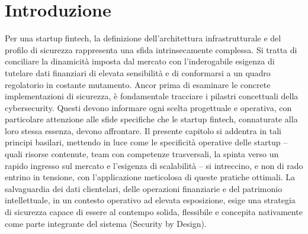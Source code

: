 \section{Introduzione}
Per una startup fintech, la definizione dell'architettura infrastrutturale e del profilo di sicurezza rappresenta una sfida intrinsecamente complessa. Si tratta di conciliare la dinamicità imposta dal mercato con l'inderogabile esigenza di tutelare dati finanziari di elevata sensibilità e di conformarsi a un quadro regolatorio in costante mutamento. Ancor prima di esaminare le concrete implementazioni di sicurezza, è fondamentale tracciare i pilastri concettuali della cybersecurity. Questi devono informare ogni scelta progettuale e operativa, con particolare attenzione alle sfide specifiche che le startup fintech, connaturate alla loro stessa essenza, devono affrontare. Il presente capitolo si addentra in tali principi basilari, mettendo in luce come le specificità operative delle startup – quali risorse contenute, team con competenze trasversali, la spinta verso un rapido ingresso sul mercato e l'esigenza di scalabilità – si intreccino, e non di rado entrino in tensione, con l'applicazione meticolosa di queste pratiche ottimali. La salvaguardia dei dati clientelari, delle operazioni finanziarie e del patrimonio intellettuale, in un contesto operativo ad elevata esposizione, esige una strategia di sicurezza capace di essere al contempo solida, flessibile e concepita nativamente come parte integrante del sistema (Security by Design).
